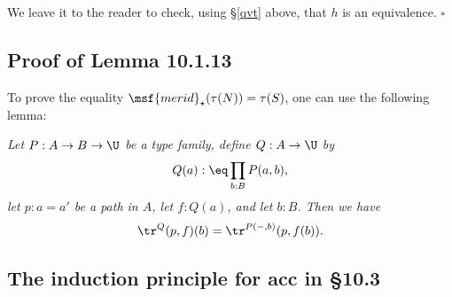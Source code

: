 \documentclass[12pt]{article}
\begin{document}
We leave it to the reader to check, using \S\ref{qvt} above, that $h$ is an equivalence. $\square$

\begin{comment}

This is about the sentence ``The obvious candidate for the coequalizer of the kernel pair of $f:A\to B$ is the image of f, as defined in \S7.6'' a few paragraphs before Lemma 10.1.1. (It's clear from the context that $A$ and $B$ are sets.) Let's show that this obvious candidate is the good one. It suffices to prove the statement

Let $A$ and $B$ be sets, let $f:A\to B$ be a surjection, define the equivalence relation $\sim$ on $A$ by 
$$
a\sim a'\text{ if and only if }f(a)=f(a'),
$$
let $A/\!\!\sim$ be the quotient as defined at the beginning of \S6.10, and let $q:A\to A/\!\!\sim$ be the canonical projection. Then there is a map $g:B\to A/\!\!\sim$ such that $g\ci f=q$:
$$
\xymatrix{
&A\ar[dl]_f\ar[dr]^q\\
B\ar[rr]_g&&A/\!\!\sim.
}
$$ 

Proof. Given $b:B$ we define the sets and maps 
$$
\xymatrix{
\fib_f(b)\ar[rr]^{\pr_1}\ar[d]_{\lv-\rv}\ar[dr]^{q_b}&&A\ar[d]^q\\ 
\lV\fib_f(b)\rV\ar[r]_h&\fib_f(b)/\!\!\sim_b\ar[r]_{\ \ k}&A/\!\!\sim
}
$$ 
as follows: Let $\sim_b$ be the equivalence relation defined on $\fib_f(b)$ by the requirement that $x\sim_b y$ for all $x,y:\fib_f(b)$, and $q_b$ the canonical projection; and note that $q_b$ induces $h$ and that $q\ci\pr_1$ induces $k$. The above diagram having been constructed, we set $g(b):\eq k(h(x))$, with $x:\lV\fib_f(b)\rV$. The equality $g\ci f=q$ is easily checked. $\square$

\end{comment}


\subsection{Proof of Lemma 10.1.13}

To prove the equality $\msf{merid}_\star(\tau(N))=\tau(S)$, one can use the following lemma:

\emph{Let $P:A\to B\to\U$ be a type family, define $Q:A\to\U$ by $$Q(a):\eq\prod_{b:B}P(a,b),$$ let $p:a=a'$ be a path in $A$, let $f:Q(a)$, and let $b:B$. Then we have} 
$$
\tr^Q(p,f)(b)=\tr^{P(-,b)}(p,f(b)).
$$


\subsection{The induction principle for \textsf{acc} in \S10.3}
\end{document}
